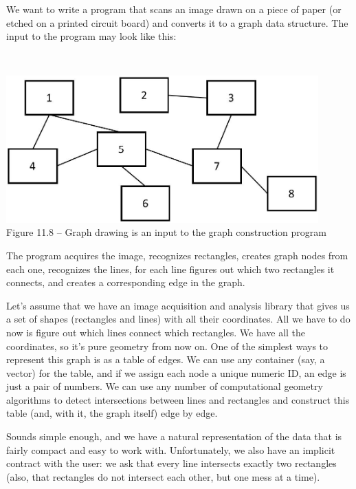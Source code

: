We want to write a program that scans an image drawn on a piece of paper (or etched on a printed circuit board) and converts it to a graph data structure. The input to the program may look like this:

\hspace*{\fill} \\ %
\begin{center}
\includegraphics[width=0.9\textwidth]{content/3/chapter11/images/8.jpg}\\
Figure 11.8 – Graph drawing is an input to the graph construction program
\end{center}

The program acquires the image, recognizes rectangles, creates graph nodes from each one, recognizes the lines, for each line figures out which two rectangles it connects, and creates a corresponding edge in the graph.

Let's assume that we have an image acquisition and analysis library that gives us a set of shapes (rectangles and lines) with all their coordinates. All we have to do now is figure out which lines connect which rectangles. We have all the coordinates, so it's pure geometry from now on. One of the simplest ways to represent this graph is as a table of edges. We can use any container (say, a vector) for the table, and if we assign each node a unique numeric ID, an edge is just a pair of numbers. We can use any number of computational geometry algorithms to detect intersections between lines and rectangles and construct this table (and, with it, the graph itself) edge by edge. 

Sounds simple enough, and we have a natural representation of the data that is fairly compact and easy to work with. Unfortunately, we also have an implicit contract with the user: we ask that every line intersects exactly two rectangles (also, that rectangles do not intersect each other, but one mess at a time). 

